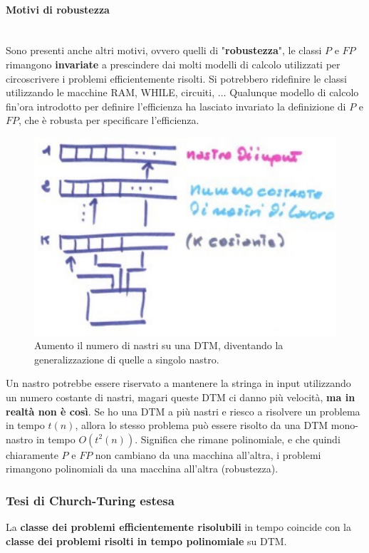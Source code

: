 \documentclass{article}
\begin{document}
\paragraph{Motivi di robustezza}\mbox{}\\
Sono presenti anche altri motivi, ovvero quelli di "\textbf{robustezza}", le classi $P$ e $FP$ rimangono
\textbf{invariate} a prescindere dai molti modelli di calcolo utilizzati per circoscrivere i problemi
efficientemente risolti. Si potrebbero ridefinire le classi utilizzando le macchine RAM, WHILE,
circuiti, $\dots$
\newline\newline
Qualunque modello di calcolo fin'ora introdotto per definire l'efficienza
ha lasciato invariato la definizione di $P$ e $FP$, che è robusta per
specificare l'efficienza.
\begin{figure}[H]
    \centering
    \includegraphics[scale=0.6]{images/robustezza.png}
    \caption{Aumento il numero di nastri su una DTM, diventando la generalizzazione
        di quelle a singolo nastro.}
\end{figure}
Un nastro potrebbe essere riservato a mantenere la stringa in input utilizzando un numero
costante di nastri, magari queste DTM ci danno più velocità, \textbf{ma in realtà non è così}. Se ho
una DTM a più nastri e riesco a risolvere un problema in tempo $t(n)$, allora lo stesso
problema può essere risolto da una DTM mono-nastro in tempo $O(t^2(n))$. Significa
che rimane polinomiale, e che quindi chiaramente $P$ e $FP$ non cambiano da una macchina
all'altra, i problemi rimangono polinomiali da una macchina all'altra (robustezza).

\subsubsection{Tesi di Church-Turing estesa}
La \textbf{classe dei problemi efficientemente risolubili} in tempo coincide con
la \textbf{classe dei problemi risolti in tempo polinomiale} su DTM.
\end{document}
